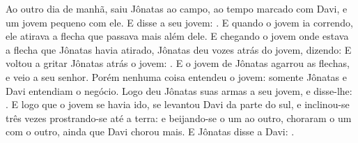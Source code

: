 {  Ao outro dia de manhã, saiu Jônatas ao campo, ao tempo marcado com Davi, e um jovem pequeno com ele.
  E disse a seu jovem: . E quando o jovem ia correndo, ele atirava a flecha que passava mais além dele.
  E chegando o jovem onde estava a flecha que Jônatas havia atirado, Jônatas deu vozes atrás do jovem, dizendo:  %
  E voltou a gritar Jônatas atrás o jovem: . E o jovem de Jônatas agarrou as flechas, e veio a seu senhor.
  Porém nenhuma coisa entendeu o jovem: somente Jônatas e Davi entendiam o negócio.
  Logo deu Jônatas suas armas a seu jovem, e disse-lhe: .
  E logo que o jovem se havia ido, se levantou Davi da parte do sul, e inclinou-se três vezes prostrando-se até a terra: e beijando-se o um ao outro, choraram o um com o outro, ainda que Davi chorou mais.
  E Jônatas disse a Davi: .
\par }


